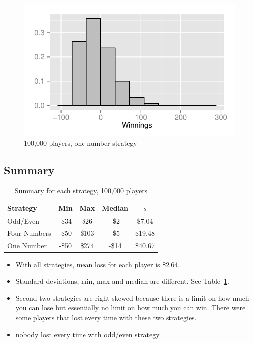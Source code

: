 \documentclass[landscape]{exam}
\begin{document}
  \begin{figure}[H]
    \centering
    \includegraphics[scale = 0.9]{figures/roulette/1_100000_50_fraction.pdf}
    \caption{100,000 players, one number strategy}
  \end{figure}

  \subsection{Summary} %
  \begin{table}[H]
    \centering
    \begin{tabular}{lcccc}
      \toprule
      Strategy     & Min   & Max   & Median & $s$ \\
      \midrule
      Odd/Even     & -\$34 & \$26  & -\$2   & \$7.04 \\
      Four Numbers & -\$50 & \$103 & -\$5   & \$19.48 \\
      One Number   & -\$50 & \$274 & -\$14  & \$40.67 \\
      \bottomrule
    \end{tabular}
    \caption{Summary for each strategy, 100,000 players}\label{tab:roulette}
  \end{table}

  \begin{itemize}
    \item With all strategies, mean loss for each player is \$2.64.

    \item Standard deviations, min, max and median are different. 
      See Table~\ref{tab:roulette}.

    \item Second two strategies are right-skewed because there is a limit on how
      much you can lose but essentially no limit on how much you can win. There
      were some players that lost every time with these two strategies.

    \item nobody lost every time with odd/even strategy
  \end{itemize}
\end{document}
